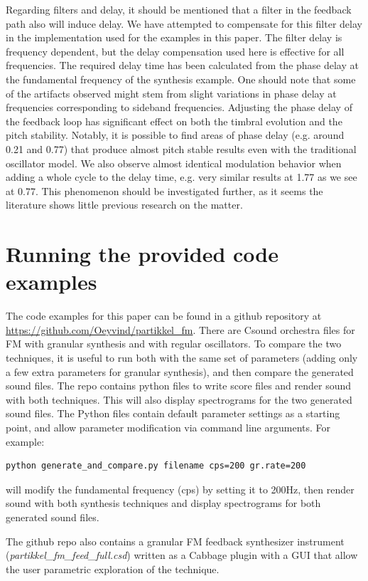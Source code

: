 \documentclass[runningheads,a4paper]{llncs}
\begin{document}
Regarding filters and delay, it should be mentioned that a filter in the feedback path also will induce delay. We have attempted to compensate for this filter delay in the implementation used for the examples in this paper. The filter delay is frequency dependent, but the delay compensation used here is effective for all frequencies. The required delay time has been calculated from the phase delay at the fundamental frequency of the synthesis example. One should note that some of the artifacts observed might stem from slight variations in phase delay at frequencies corresponding to sideband frequencies. 
Adjusting the phase delay of the feedback loop has significant effect on both the timbral evolution and the pitch stability. Notably, it is possible to find areas of phase delay (e.g. around 0.21 and 0.77) that produce almost pitch stable results even with the traditional oscillator model. We also observe almost identical modulation behavior when adding a whole cycle to the delay time, e.g. very similar results at 1.77 as we see at 0.77. This phenomenon should be investigated further, as it seems the literature shows little previous research on the matter.

\section{Running the provided code examples}
The code examples for this paper can be found in a github repository at \url{https://github.com/Oeyvind/partikkel_fm}. There are Csound orchestra files for FM with granular synthesis and with regular oscillators. To compare the two techniques, it is useful to run both with the same set of parameters (adding only a few extra parameters for granular synthesis), and then compare the generated sound files. The repo contains python files to write score files and render sound with both techniques. This will also display spectrograms for the two generated sound files. The Python files contain default parameter settings as a starting point, and allow parameter modification via command line arguments. For example:
\begin{lstlisting}
python generate_and_compare.py filename cps=200 gr.rate=200
\end{lstlisting}
will modify the fundamental frequency (cps) by setting it to 200Hz, then render sound with both synthesis techniques and display spectrograms for both generated sound files. 

The github repo also contains a granular FM feedback synthesizer instrument (\emph{partikkel\_fm\_feed\_full.csd}) written as a Cabbage plugin with a GUI that allow the user parametric exploration of the technique.
\end{document}
